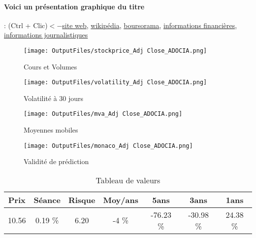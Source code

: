 \documentclass[11pt,a4paper]{report}%
\begin{document}
\paragraph{Voici un présentation graphique du titre} : (Ctrl + Clic)$<-$\href{https://www.adocia.com/fr/}{site web}, \href{https://fr.wikipedia.org/wiki/Adocia}{wikipédia}, \href{https://www.boursorama.com/cours/1rPADOC}{boursorama}, \href{https://www.qwant.com/?q=site:https:%2f%2fwww.easybourse.com%2faction-societe%2fADOCIA&t=web&client=ext-firefox-hp}{informations financières}, \href{https://bourse.lerevenu.com/cours-de-bourse/fiche-valeur-synthese/ADOCIA/ADOC-FR}{informations journalistiques}
\begin{figure}[!htb]
   \begin{minipage}{0.5\textwidth}
     \centering
     \texttt{[image: OutputFiles/stockprice\_Adj Close\_ADOCIA.png]}
     \caption{Cours et Volumes}\label{Fig:price_ADOCIA}
   \end{minipage}\hfill
   \begin{minipage}{0.5\textwidth}
     \centering
     \texttt{[image: OutputFiles/volatility\_Adj Close\_ADOCIA.png]}
     \caption{Volatilité à 30 jours}\label{Fig:volat_ADOCIA}
   \end{minipage}
\end{figure}
\begin{figure}[!htb]
   \begin{minipage}{0.5\textwidth}
     \centering
     \texttt{[image: OutputFiles/mva\_Adj Close\_ADOCIA.png]}
     \caption{Moyennes mobiles}\label{Fig:mva_ADOCIA}
   \end{minipage}\hfill
   \begin{minipage}{0.5\textwidth}
     \centering
     \texttt{[image: OutputFiles/monaco\_Adj Close\_ADOCIA.png]}
     \caption{Validité de prédiction}\label{Fig:prediction_ADOCIA}
   \end{minipage}
\end{figure}

\begin{table}[H]
  \centering
    \begin{tabular}{|c|c|c|c|c|c|c|}
    \hline
    Prix & Séance & Risque  & Moy/ans & 5ans & 3ans & 1ans \\
    \hline
    10.56 &    0.19 \%    & 6.20 & -4 \% & -76.23 \% & -30.98 \% & 24.38 \% \\
    \hline
    \end{tabular}%
        \label{tab:table_ADOCIA}%
      \caption{Tableau de valeurs}
\end{table}%
\end{document}
